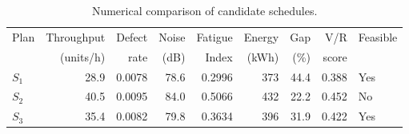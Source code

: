 \begin{table}[htbp]
\centering
\caption{Numerical comparison of candidate schedules.}
\label{tab:numerical-sim}
\small
\begin{tabular}{@{}lrrrrrrrl@{}}
\toprule
Plan & Throughput & Defect & Noise & Fatigue & Energy & Gap & V/R & Feasible \\
     & (units/h)  & rate   & (dB)  & Index   & (kWh)  & (\%) & score &         \\
\midrule
$S_{1}$ & 28.9 & 0.0078 & 78.6 & 0.2996 & 373 & 44.4 & 0.388 & Yes \\
$S_{2}$ & 40.5 & 0.0095 & 84.0 & 0.5066 & 432 & 22.2 & 0.452 & No \\
$S_{3}$ & 35.4 & 0.0082 & 79.8 & 0.3634 & 396 & 31.9 & 0.422 & Yes \\
\bottomrule
\end{tabular}
\end{table}
